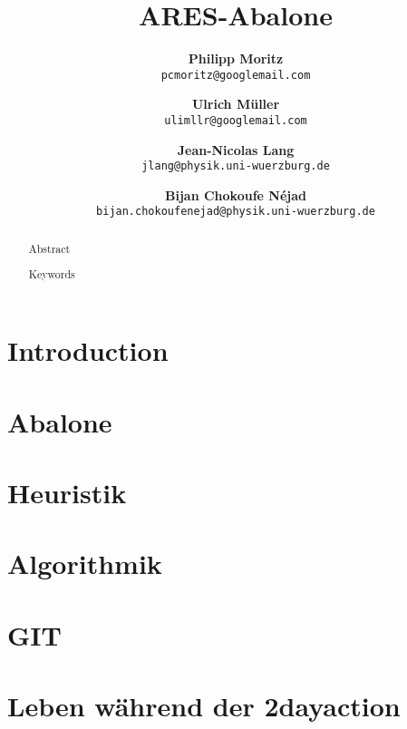 \documentclass[a4paper,twoside]{article}
\title{{\sc ARES-Abalone}}
\author{
{
\small \bf Philipp Moritz}\\
 \small\texttt{pcmoritz@googlemail.com} 
  \and
 {\small \bf Ulrich Müller} \\ 
 \small \texttt{ulimllr@googlemail.com}
	\and
  {\small \bf Jean-Nicolas Lang}\\
  \small\texttt{jlang@physik.uni-wuerzburg.de}
  \and
  {\small \bf Bijan Chokoufe Néjad}\\
  \small\texttt{bijan.chokoufenejad@physik.uni-wuerzburg.de}
}
\date{}
\begin{document}
\renewcommand{\bibsection}{\section*{References}}

\maketitle

\begin{abstract}
  Abstract
    
\bigskip

 Keywords
\bigskip

\end{abstract}
\section{Introduction}


\section{Abalone}


\section{Heuristik}


\section{Algorithmik}


\section{GIT}


\section{Leben während der 2dayaction}





\end{document}

